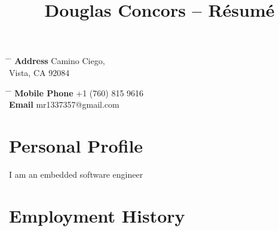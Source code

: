 \documentclass[10pt]{article} %
\begin{document}

\title{Douglas Concors -- Résumé} %


\parbox{0.5\textwidth}{ %
\begin{tabbing} %
\hspace{3cm} \= \hspace{4cm} \= \kill %
{\bf Address}  Camino Ciego,\\ %
\> Vista, CA 92084 \\ %
\end{tabbing}}
\hfill %
\parbox{0.5\textwidth}{ %
\begin{tabbing} %
\hspace{3cm} \= \hspace{4cm} \= \kill %
{\bf Mobile Phone} \> +1 (760) 815 9616 \\ %
{\bf Email} \> mr1337357@gmail.com \\ %
\end{tabbing}}


\section{Personal Profile}

I am an embedded software engineer


\section{Employment History}
\end{document}
